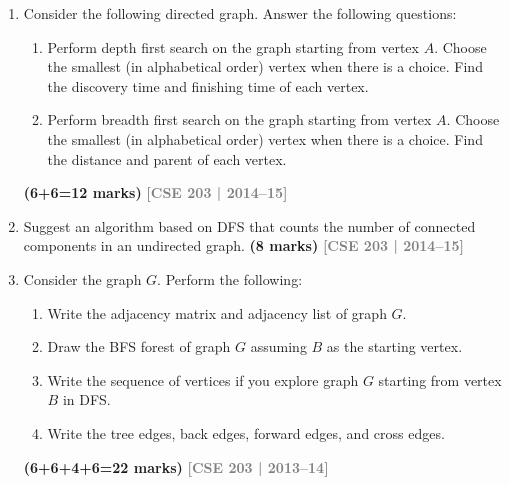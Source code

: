 \documentclass[12pt,a3paper]{article}
\newcommand{\yr}[1]{\hfill\textcolor{gray}{\small\textbf{[#1]}}}
\newcommand{\mk}[1]{\textcolor{orange!70!black}{\small\textbf{(#1 marks)}}}
\begin{document}
\begin{enumerate}

\item Consider the following directed graph. Answer the following questions:
\begin{enumerate}
  \item Perform depth first search on the graph starting from vertex $A$. Choose the
  smallest (in alphabetical order) vertex when there is a choice. Find the
  discovery time and finishing time of each vertex.
  \item Perform breadth first search on the graph starting from vertex $A$. Choose
  the smallest (in alphabetical order) vertex when there is a choice. Find the
  distance and parent of each vertex.
\end{enumerate}
\begin{center}
\end{center}
\mk{6+6=12}
\yr{CSE 203 | 2014--15}


\item Suggest an algorithm based on DFS that counts the number of connected
components in an undirected graph. \mk{8}
\yr{CSE 203 | 2014--15}

\item Consider the graph $G$. Perform the following:
\begin{enumerate}
  \item Write the adjacency matrix and adjacency list of graph $G$.
  \item Draw the BFS forest of graph $G$ assuming $B$ as the starting vertex.
  \item Write the sequence of vertices if you explore graph $G$ starting from vertex $B$ in DFS.
  \item Write the tree edges, back edges, forward edges, and cross edges.
\end{enumerate}
\mk{6+6+4+6=22}
\yr{CSE 203 | 2013--14}


\end{enumerate}
\end{document}
